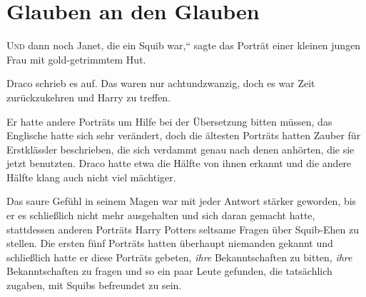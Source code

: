 \chapter{Glauben an den Glauben}


\lettrine[ante=„]{U}{nd} dann noch Janet, die ein Squib war,“ sagte das Porträt einer kleinen jungen Frau mit gold-getrimmtem Hut.

Draco schrieb es auf. Das waren nur achtundzwanzig, doch es war Zeit zurückzukehren und Harry zu treffen.

Er hatte andere Porträts um Hilfe bei der Übersetzung bitten müssen, das Englische hatte sich sehr verändert, doch die ältesten Porträts hatten Zauber für Erstklässler beschrieben, die sich verdammt genau nach denen anhörten, die sie jetzt benutzten. Draco hatte etwa die Hälfte von ihnen erkannt und die andere Hälfte klang auch nicht viel mächtiger.

Das saure Gefühl in seinem Magen war mit jeder Antwort stärker geworden, bis er es schließlich nicht mehr ausgehalten und sich daran gemacht hatte, stattdessen anderen Porträts Harry Potters seltsame Fragen über Squib-Ehen zu stellen. Die ersten fünf Porträts hatten überhaupt niemanden gekannt und schließlich hatte er diese Porträts gebeten, \emph{ihre} Bekanntschaften zu bitten, \emph{ihre} Bekanntschaften zu fragen und so ein paar Leute gefunden, die tatsächlich zugaben, mit Squibs befreundet zu sein.

